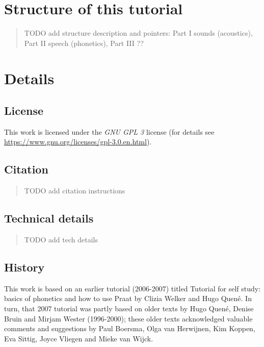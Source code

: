 \documentclass[
]{book}
\begin{document}
\section*{Structure of this tutorial}\label{structure-of-this-tutorial}

\begin{quote}
TODO add structure description and pointers: Part I sounds (acoustics), Part II speech (phonetics), Part III ??
\end{quote}

\section*{Details}\label{details}

\subsection*{License}\label{license}

This work is licensed under the \emph{GNU GPL 3} license (for details see
\url{https://www.gnu.org/licenses/gpl-3.0.en.html}).

\subsection*{Citation}\label{citation}

\begin{quote}
TODO add citation instructions
\end{quote}

\subsection*{Technical details}\label{technical-details}

\begin{quote}
TODO add tech details
\end{quote}

\subsection*{History}\label{history}

This work is based on an earlier tutorial (2006-2007) titled Tutorial for self study: basics of phonetics and how to use Praat by Clizia Welker and Hugo Quené. In turn, that 2007 tutorial was partly based on older texts by Hugo Quené, Denise Bruin and Mirjam Wester (1996-2000); these older texts acknowledged valuable comments and suggestions by Paul Boersma, Olga van Herwijnen, Kim Koppen, Eva Sittig, Joyce Vliegen and Mieke van Wijck.
\end{document}
